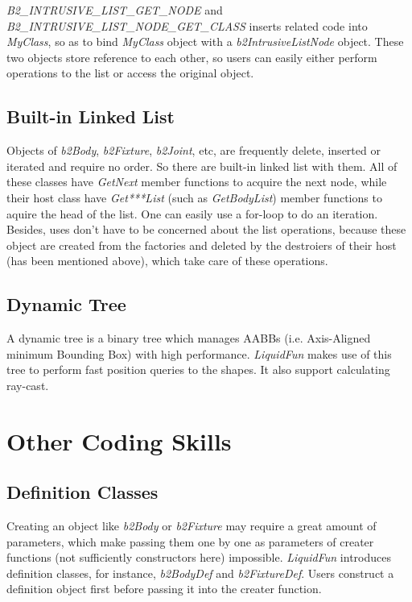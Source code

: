 \documentclass[UTF8]{ctexart}
\begin{document}
            \textit{B2\_INTRUSIVE\_LIST\_GET\_NODE} and \textit{B2\_INTRUSIVE\_LIST\_NODE\_GET\_CLASS} inserts related code into \textit{MyClass}, so as to bind \textit{MyClass} object with a \textit{b2IntrusiveListNode} object. These two objects store reference to each other, so users can easily either perform operations to the list or access the original object.

        \subsection{Built-in Linked List}

        Objects of \textit{b2Body}, \textit{b2Fixture}, \textit{b2Joint}, etc, are frequently delete, inserted or iterated and require no order. So there are built-in linked list with them. All of these classes have \textit{GetNext} member functions to acquire the next node, while their host class have \textit{Get***List} (such as \textit{GetBodyList}) member functions to aquire the head of the list. One can easily use a for-loop to do an iteration. Besides, uses don't have to be concerned about the list operations, because these object are created from the factories and deleted by the destroiers of their host (has been mentioned above), which take care of these operations.

        \subsection{Dynamic Tree}

            A dynamic tree is a binary tree which manages AABBs (i.e. Axis-Aligned minimum Bounding Box) with high performance. \textit{LiquidFun} makes use of this tree to perform fast position queries to the shapes. It also support calculating ray-cast.

    \section{Other Coding Skills}
        
        \subsection{Definition Classes}

            Creating an object like \textit{b2Body} or \textit{b2Fixture} may require a great amount of parameters, which make passing them one by one as parameters of creater functions (not sufficiently constructors here) impossible. \textit{LiquidFun} introduces definition classes, for instance, \textit{b2BodyDef} and \textit{b2FixtureDef}. Users construct a definition object first before passing it into the creater function.
\end{document}
